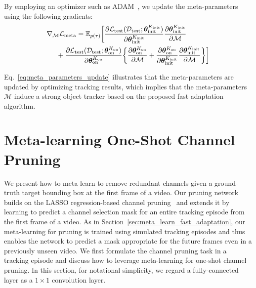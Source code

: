 \documentclass[letterpaper]{article} %
\def \dataval{\mathcal{D}_\text{test}}
\def \thetainitadapt{\boldsymbol{\theta}_\text{init}}
\def \thetaonlineadapt{\boldsymbol{\theta}_\text{on}}
\def \Ainit{\mathcal{A}_\text{init}}
\def \Aonline{\mathcal{A}_\text{on}}
\def \Kinit{K_\text{init}}
\def \Konline{K_\text{on}}
\def \lossval{\mathcal{L}_\text{test}}
\def \lossmeta{\mathcal{L}_\text{meta}}
\begin{document}
By employing an optimizer such as ADAM~\cite{diederik2014adam}, we update the meta-parameters using the following gradients:
\begin{equation}
\begin{split}
&%
\nabla_\mathcal{M}\lossmeta=\mathbb{E}_{p(\tau)}\bigg[
\frac{\partial \lossval(\dataval;\thetainitadapt^{\Kinit})}{\partial\thetainitadapt^{\Kinit}}
\frac{\partial\thetainitadapt^{\Kinit}}{\partial\mathcal{M}}
\\
&\hspace{0.5cm}%
+
\frac{\partial \lossval(\dataval;\thetaonlineadapt^{\Konline})}{\partial\thetaonlineadapt^{\Konline}}
\bigg\{
\frac{\partial\thetaonlineadapt^{\Konline}}{\partial\mathcal{M}}
+
\frac{\partial\thetaonlineadapt^{\Konline}}{\partial\thetainitadapt^{\Kinit}}
\frac{\partial\thetainitadapt^{\Kinit}}{\partial\mathcal{M}}
\bigg\}
\bigg]
\label{eq:meta_parameters_update}
\end{split}
\end{equation}

Eq.~\eqref{eq:meta_parameters_update} illustrates that the meta-parameters are updated by optimizing tracking results, which implies that the meta-parameters $\mathcal{M}$ induce a strong object tracker based on the proposed fast adaptation algorithm.

\section{Meta-learning One-Shot Channel Pruning}

We present how to meta-learn to remove redundant channels given a ground-truth target bounding box at the first frame of a video.
Our pruning network builds on the LASSO regression-based channel pruning~\cite{he2017channel} and extends it by learning to predict a channel selection mask for an entire tracking episode from the first frame of a video. 
As in Section~\ref{sec:meta_learn_fast_adaptation}, our meta-learning for pruning is trained using simulated tracking episodes and thus enables the network to predict a mask appropriate for the future frames even in a previously unseen video. 
We first formulate the channel pruning task in a tracking episode and discuss how to leverage meta-learning for one-shot channel pruning.
In this section, for notational simplicity, we regard a fully-connected layer as a $1 \times 1$ convolution layer.
\end{document}

